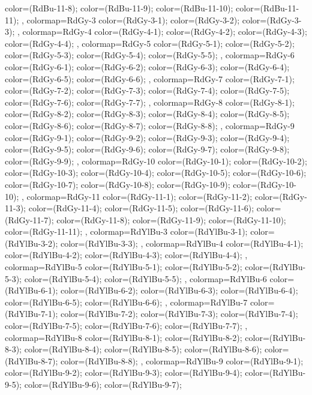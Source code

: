 {{  color=(RdBu-11-8);
  color=(RdBu-11-9);
  color=(RdBu-11-10);
  color=(RdBu-11-11);
},
colormap={RdGy-3}{
  color=(RdGy-3-1);
  color=(RdGy-3-2);
  color=(RdGy-3-3);
},
colormap={RdGy-4}{
  color=(RdGy-4-1);
  color=(RdGy-4-2);
  color=(RdGy-4-3);
  color=(RdGy-4-4);
},
colormap={RdGy-5}{
  color=(RdGy-5-1);
  color=(RdGy-5-2);
  color=(RdGy-5-3);
  color=(RdGy-5-4);
  color=(RdGy-5-5);
},
colormap={RdGy-6}{
  color=(RdGy-6-1);
  color=(RdGy-6-2);
  color=(RdGy-6-3);
  color=(RdGy-6-4);
  color=(RdGy-6-5);
  color=(RdGy-6-6);
},
colormap={RdGy-7}{
  color=(RdGy-7-1);
  color=(RdGy-7-2);
  color=(RdGy-7-3);
  color=(RdGy-7-4);
  color=(RdGy-7-5);
  color=(RdGy-7-6);
  color=(RdGy-7-7);
},
colormap={RdGy-8}{
  color=(RdGy-8-1);
  color=(RdGy-8-2);
  color=(RdGy-8-3);
  color=(RdGy-8-4);
  color=(RdGy-8-5);
  color=(RdGy-8-6);
  color=(RdGy-8-7);
  color=(RdGy-8-8);
},
colormap={RdGy-9}{
  color=(RdGy-9-1);
  color=(RdGy-9-2);
  color=(RdGy-9-3);
  color=(RdGy-9-4);
  color=(RdGy-9-5);
  color=(RdGy-9-6);
  color=(RdGy-9-7);
  color=(RdGy-9-8);
  color=(RdGy-9-9);
},
colormap={RdGy-10}{
  color=(RdGy-10-1);
  color=(RdGy-10-2);
  color=(RdGy-10-3);
  color=(RdGy-10-4);
  color=(RdGy-10-5);
  color=(RdGy-10-6);
  color=(RdGy-10-7);
  color=(RdGy-10-8);
  color=(RdGy-10-9);
  color=(RdGy-10-10);
},
colormap={RdGy-11}{
  color=(RdGy-11-1);
  color=(RdGy-11-2);
  color=(RdGy-11-3);
  color=(RdGy-11-4);
  color=(RdGy-11-5);
  color=(RdGy-11-6);
  color=(RdGy-11-7);
  color=(RdGy-11-8);
  color=(RdGy-11-9);
  color=(RdGy-11-10);
  color=(RdGy-11-11);
},
colormap={RdYlBu-3}{
  color=(RdYlBu-3-1);
  color=(RdYlBu-3-2);
  color=(RdYlBu-3-3);
},
colormap={RdYlBu-4}{
  color=(RdYlBu-4-1);
  color=(RdYlBu-4-2);
  color=(RdYlBu-4-3);
  color=(RdYlBu-4-4);
},
colormap={RdYlBu-5}{
  color=(RdYlBu-5-1);
  color=(RdYlBu-5-2);
  color=(RdYlBu-5-3);
  color=(RdYlBu-5-4);
  color=(RdYlBu-5-5);
},
colormap={RdYlBu-6}{
  color=(RdYlBu-6-1);
  color=(RdYlBu-6-2);
  color=(RdYlBu-6-3);
  color=(RdYlBu-6-4);
  color=(RdYlBu-6-5);
  color=(RdYlBu-6-6);
},
colormap={RdYlBu-7}{
  color=(RdYlBu-7-1);
  color=(RdYlBu-7-2);
  color=(RdYlBu-7-3);
  color=(RdYlBu-7-4);
  color=(RdYlBu-7-5);
  color=(RdYlBu-7-6);
  color=(RdYlBu-7-7);
},
colormap={RdYlBu-8}{
  color=(RdYlBu-8-1);
  color=(RdYlBu-8-2);
  color=(RdYlBu-8-3);
  color=(RdYlBu-8-4);
  color=(RdYlBu-8-5);
  color=(RdYlBu-8-6);
  color=(RdYlBu-8-7);
  color=(RdYlBu-8-8);
},
colormap={RdYlBu-9}{
  color=(RdYlBu-9-1);
  color=(RdYlBu-9-2);
  color=(RdYlBu-9-3);
  color=(RdYlBu-9-4);
  color=(RdYlBu-9-5);
  color=(RdYlBu-9-6);
  color=(RdYlBu-9-7);
}}
